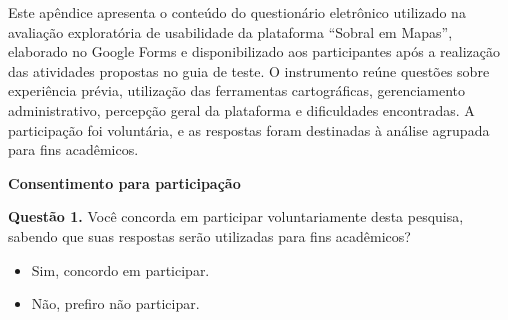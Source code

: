 \label{ap:questionario-usabilidade}

Este apêndice apresenta o conteúdo do questionário eletrônico utilizado na avaliação exploratória de usabilidade da plataforma ``Sobral em Mapas'', elaborado no Google Forms e disponibilizado aos participantes após a realização das atividades propostas no guia de teste. O instrumento reúne questões sobre experiência prévia, utilização das ferramentas cartográficas, gerenciamento administrativo, percepção geral da plataforma e dificuldades encontradas. A participação foi voluntária, e as respostas foram destinadas à análise agrupada para fins acadêmicos.

\newenvironment{alternativasFormulario}
{\begin{itemize}\renewcommand{\labelitemi}{$\circ$}\setlength{\itemsep}{1pt}\setlength{\parsep}{0pt}}
{\end{itemize}}

\newcommand{\escalaFormulario}{%
    \par\noindent\hspace*{0.8cm}%
    {\small $\circ$~1\qquad $\circ$~2\qquad $\circ$~3\qquad $\circ$~4\qquad $\circ$~5}%
    \par\medskip
}

\newcommand{\questaoComEscala}[2]{%
    \par\noindent\begin{minipage}{\linewidth}
    \noindent\textbf{Questão #1.} #2
    \escalaFormulario
    \end{minipage}
    \par\medskip
}

\noindent\textbf{Consentimento para participação}
\par\medskip

\noindent\textbf{Questão 1.} Você concorda em participar voluntariamente desta pesquisa, sabendo que suas respostas serão utilizadas para fins acadêmicos?
\begin{alternativasFormulario}
    \item Sim, concordo em participar.
    \item Não, prefiro não participar.
\end{alternativasFormulario}

